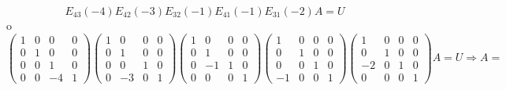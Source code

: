 \documentclass[11pt,letterpaper]{article}
\begin{document}
\begin{enumerate}
$$E_{43}(-4)E_{42}(-3)E_{32}(-1)E_{41}(-1)E_{31}(-2)A=U $$
o
$$\left(\begin{array}{cccc}
1&0&0&0\\
0&1&0&0\\
0&0&1&0\\
0&0&-4&1
\end{array} \right) \left(\begin{array}{cccc}
1&0&0&0\\
0&1&0&0\\
0&0&1&0\\
0&-3&0&1
\end{array} \right)\left(\begin{array}{cccc}
1&0&0&0\\
0&1&0&0\\
0&-1&1&0\\
0&0&0&1
\end{array} \right)\left(\begin{array}{cccc}
1&0&0&0\\
0&1&0&0\\
0&0&1&0\\
-1&0&0&1
\end{array} \right)\left(\begin{array}{cccc}
1&0&0&0\\
0&1&0&0\\
-2&0&1&0\\
0&0&0&1
\end{array} \right)A=U\Rightarrow A=$$


\end{enumerate}
\end{document}
